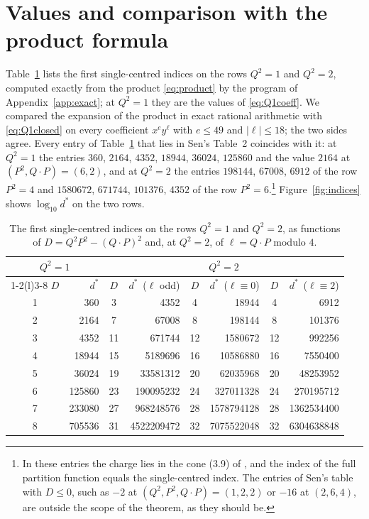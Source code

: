 \documentclass[11pt]{amsart}
\theoremstyle{definition}
\begin{document}












\section{Values and comparison with the product formula}\label{sec:values}

Table~\ref{tab:values} lists the first single-centred indices on the rows $Q^2=1$ and $Q^2=2$, computed exactly from the product \eqref{eq:product} by the program of Appendix~\ref{app:exact}; at $Q^2=1$ they are the values of \eqref{eq:Q1coeff}. We compared the expansion of the product in exact rational arithmetic with \eqref{eq:Q1closed} on every coefficient $x^ey^\ell$ with $e\le 49$ and $|\ell|\le18$; the two sides agree. Every entry of Table~\ref{tab:values} that lies in Sen's Table~2 \cite{Sen11} coincides with it: at $Q^2=1$ the entries $360$, $2164$, $4352$, $18944$, $36024$, $125860$ and the value $2164$ at $(P^2,Q\cdot P)=(6,2)$, and at $Q^2=2$ the entries $198144$, $67008$, $6912$ of the row $P^2=4$ and $1580672$, $671744$, $101376$, $4352$ of the row $P^2=6$.\footnote{In these entries the charge lies in the cone (3.9) of \cite{Sen11}, and the index of the full partition function equals the single-centred index. The entries of Sen's table with $D\le0$, such as $-2$ at $(Q^2,P^2,Q\cdot P)=(1,2,2)$ or $-16$ at $(2,6,4)$, are outside the scope of the theorem, as they should be.} Figure~\ref{fig:indices} shows $\log_{10}d^*$ on the two rows.

\begin{table}[t]
\centering
\small
\begin{tabular}{@{}cr@{\qquad}cr@{\qquad}cr@{\qquad}cr@{}}
\toprule
\multicolumn{2}{c}{$Q^2=1$} & \multicolumn{6}{c}{$Q^2=2$}\\
\cmidrule(r){1-2}\cmidrule(l){3-8}
$D$ & $d^*$ & $D$ & $d^*$\ ($\ell$ odd) & $D$ & $d^*$\ ($\ell\equiv0$) & $D$ & $d^*$\ ($\ell\equiv2$)\\
\midrule
1 & 360 & 3 & 4352 & 4 & 18944 & 4 & 6912\\
2 & 2164 & 7 & 67008 & 8 & 198144 & 8 & 101376\\
3 & 4352 & 11 & 671744 & 12 & 1580672 & 12 & 992256\\
4 & 18944 & 15 & 5189696 & 16 & 10586880 & 16 & 7550400\\
5 & 36024 & 19 & 33581312 & 20 & 62035968 & 20 & 48253952\\
6 & 125860 & 23 & 190095232 & 24 & 327011328 & 24 & 270195712\\
7 & 233080 & 27 & 968248576 & 28 & 1578794128 & 28 & 1362534400\\
8 & 705536 & 31 & 4522209472 & 32 & 7075522048 & 32 & 6304638848\\
\bottomrule
\end{tabular}
\caption{The first single-centred indices on the rows $Q^2=1$ and $Q^2=2$, as functions of $D=Q^2P^2-(Q\cdot P)^2$ and, at $Q^2=2$, of $\ell=Q\cdot P$ modulo $4$.}\label{tab:values}
\end{table}
\end{document}
